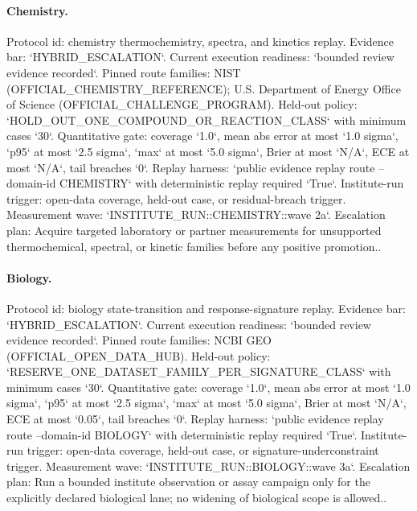 \paragraph{Chemistry.}
Protocol id: chemistry thermochemistry, spectra, and kinetics replay. Evidence bar: `HYBRID\_ESCALATION`. Current execution readiness: `bounded review evidence recorded`.
Pinned route families: NIST (OFFICIAL\_CHEMISTRY\_REFERENCE); U.S. Department of Energy Office of Science (OFFICIAL\_CHALLENGE\_PROGRAM).
Held-out policy: `HOLD\_OUT\_ONE\_COMPOUND\_OR\_REACTION\_CLASS` with minimum cases `30`.
Quantitative gate: coverage `1.0`, mean abs error at most `1.0 sigma`, `p95` at most `2.5 sigma`, `max` at most `5.0 sigma`, Brier at most `N/A`, ECE at most `N/A`, tail breaches `0`.
Replay harness: `public evidence replay route --domain-id CHEMISTRY` with deterministic replay required `True`.
Institute-run trigger: open-data coverage, held-out case, or residual-breach trigger. Measurement wave: `INSTITUTE\_RUN::CHEMISTRY::wave 2a`.
Escalation plan: Acquire targeted laboratory or partner measurements for unsupported thermochemical, spectral, or kinetic families before any positive promotion..

\paragraph{Biology.}
Protocol id: biology state-transition and response-signature replay. Evidence bar: `HYBRID\_ESCALATION`. Current execution readiness: `bounded review evidence recorded`.
Pinned route families: NCBI GEO (OFFICIAL\_OPEN\_DATA\_HUB).
Held-out policy: `RESERVE\_ONE\_DATASET\_FAMILY\_PER\_SIGNATURE\_CLASS` with minimum cases `30`.
Quantitative gate: coverage `1.0`, mean abs error at most `1.0 sigma`, `p95` at most `2.5 sigma`, `max` at most `5.0 sigma`, Brier at most `N/A`, ECE at most `0.05`, tail breaches `0`.
Replay harness: `public evidence replay route --domain-id BIOLOGY` with deterministic replay required `True`.
Institute-run trigger: open-data coverage, held-out case, or signature-underconstraint trigger. Measurement wave: `INSTITUTE\_RUN::BIOLOGY::wave 3a`.
Escalation plan: Run a bounded institute observation or assay campaign only for the explicitly declared biological lane; no widening of biological scope is allowed..

